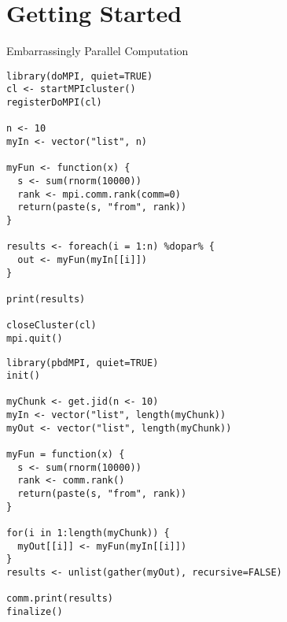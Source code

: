\section{Getting Started}
\makesubcontentsslides


\begin{frame}
  \begin{block}{Embarrassingly Parallel Computation}\pause
    \vspace{-1ex}
    \begin{minipage}[t]{.45\textwidth}
      \begin{lstlisting}[title=EPforeach.R "asking for parallel",basicstyle=\tiny]
library(doMPI, quiet=TRUE)
cl <- startMPIcluster()
registerDoMPI(cl)

n <- 10
myIn <- vector("list", n)

myFun <- function(x) {
  s <- sum(rnorm(10000))
  rank <- mpi.comm.rank(comm=0)
  return(paste(s, "from", rank))
}

results <- foreach(i = 1:n) %dopar% {
  out <- myFun(myIn[[i]])
}

print(results)

closeCluster(cl)
mpi.quit()
      \end{lstlisting}
    \end{minipage}
    \hfill
    \begin{minipage}[t]{.5\textwidth}
      \begin{lstlisting}[title=EPpbdR.R "thinking parallel",basicstyle=\tiny]
library(pbdMPI, quiet=TRUE)
init()

myChunk <- get.jid(n <- 10)
myIn <- vector("list", length(myChunk))
myOut <- vector("list", length(myChunk))

myFun = function(x) {
  s <- sum(rnorm(10000))
  rank <- comm.rank()
  return(paste(s, "from", rank))
}

for(i in 1:length(myChunk)) {
  myOut[[i]] <- myFun(myIn[[i]])
}
results <- unlist(gather(myOut), recursive=FALSE)

comm.print(results)
finalize()
      \end{lstlisting}
    \end{minipage}
  \end{block}
\end{frame}



